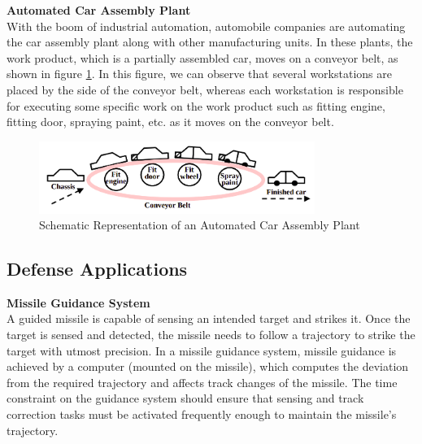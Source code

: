 \documentclass[12pt]{report}
\begin{document}
\noindent\textbf{Automated Car Assembly Plant}\\
With the boom of industrial automation, automobile companies are automating the car assembly plant along with other manufacturing units. In these plants, the work product, which is a partially assembled car, moves on a conveyor belt, as shown in figure \ref{fig:car}. In this figure, we can observe that several workstations are placed by the side of the conveyor belt, whereas each workstation is responsible for executing some specific work on the work product such as fitting engine, fitting door, spraying paint, etc. as it moves on the conveyor belt. 
\begin{figure}[h]
    \centering
    \includegraphics[width=0.8\textwidth]{images/car-assembly.png}
    \caption[Schematic Representation of an Automated Car Assembly Plant]{Schematic Representation of an Automated Car Assembly Plant \cite{NPTEL}}
    \label{fig:car}
\end{figure}


\subsection{Defense Applications}
\noindent\textbf{Missile Guidance System}\\
A guided missile is capable of sensing an intended target and strikes it. Once the target is sensed and detected, the missile needs to follow a trajectory to strike the target with utmost precision. In a missile guidance system, missile guidance is achieved by a computer (mounted on the missile), which computes the deviation from the required trajectory and affects track changes of the missile. The time constraint on the guidance system should ensure that sensing and track correction tasks must be activated frequently enough to maintain the missile's trajectory. 
\end{document}
